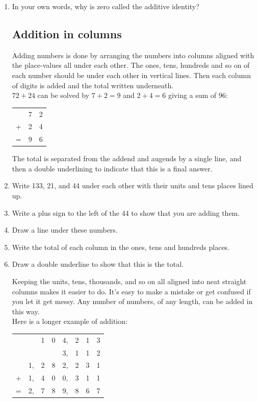 \documentclass[12pt]{article}
\begin{document}
\begin{enumerate}
\item In your own words, why is zero called the additive identity?

\subsection*{Addition in columns}
Adding numbers is done by arranging the numbers into columns aligned with the place-values all under each other. The ones, tens, hundreds and so on of each number should be under each other in vertical lines. Then each column of digits is added and the total written underneath.\\

$72 + 24$ can be solved by $7 + 2 = 9$ and $2 + 4 = 6$ giving a sum of 96:

\begin{center}
\begin{tabular}{c@{\,}c@{\,}c@{\,}}
 &7&2\\
+&2&4\\
\hline
=&9&6\\
\hline
\hline
\end{tabular}
\end{center}

The total is separated from the addend and augends by a single line, and then a  double underlining to indicate that this is a final answer.\\

\item Write 133, 21, and 44 under each other with their units and tens places lined up.
\item Write a plus sign to the left of the 44 to show that you are adding them.
\item Draw a line under these numbers.
\item Write the total of each column in the ones, tens and hundreds places.
\item Draw a double underline to show that this is the total.

Keeping the units, tens, thousands, and so on all aligned into neat straight columns makes it easier to do. It's easy to make a mistake or get confused if you let it get messy. Any number of numbers, of any length, can be added in this way.\\

Here is a longer example of addition:\\

\begin{center}
\begin{tabular}{c@{\,}c@{\,}c@{\,}c@{\,}c@{\,}c@{\,}c@{\,}c@{\,}}
 & &1&0&4,&2&1&3\\
 & & & &3,&1&1&2\\
 &1,&2&8&2,&2&3&1\\
+&1,&4&0&0,&3&1&1\\
\hline
=&2,&7&8&9,&8&6&7\\
\hline
\hline
\end{tabular}\\
\end{center}


\end{enumerate}
\end{document}

